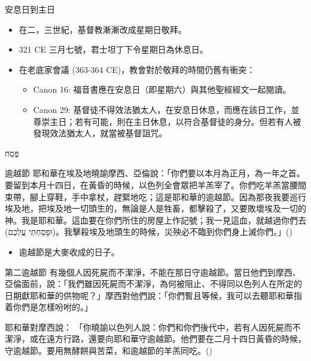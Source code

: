 \documentclass{beamer}
\newcommand{\topic}[1]{
  \begin{frame}
    \centering
    \vspace*{1cm}
    {\fontsize{40}{48}\selectfont #1\par}
    \vfill
  \end{frame}
}
\newcommand{\parvspace}{\par\vspace{0.5em}}
\begin{document}
\begin{frame}{安息日到主日}
  \begin{itemize}
    \item 在二，三世紀，基督教漸漸改成星期日敬拜。\parencite{SabbathInChristianity}
    \item 321 CE 三月七號，君士坦丁下令星期日為休息日。\parencite{SabbathInChristianity}
    \item 在老底家會議 (363-364 CE)，教會對於敬拜的時間仍舊有衝突\parencite{SynodOfLaodicea}：
      \begin{itemize}
        \item Canon 16: 福音書應在安息日（即星期六）與其他聖經經文一起閱讀。
        \item Canon 29: 基督徒不得效法猶太人，在安息日休息，而應在該日工作，並尊崇主日；若有可能，則在主日休息，以符合基督徒的身分。但若有人被發現效法猶太人，就當被基督詛咒。
      \end{itemize}
  \end{itemize}
\end{frame}

\topic{\texthebrew{פֶּסַח}}

\begin{frame}{逾越節}
  耶和華在埃及地曉諭摩西、亞倫說：「你們要以\alert{本月為正月}，為一年之首。\textellipsis{}要留到\alert{本月十四日}，在黃昏的時候，以色列全會眾把羊羔宰了。\textellipsis{}你們吃羊羔當腰間束帶，腳上穿鞋，手中拿杖，趕緊地吃；這是耶和華的逾越節。因為那夜我要巡行埃及地，把埃及地一切頭生的，無論是人是牲畜，都擊殺了，又要敗壞埃及一切的神。我是耶和華。這血要在你們所住的房屋上作記號；我一見這血，\alert{就越過你們去 (\texthebrew{וּפָסַחְתִּי עֲלֵכֶם})}。我擊殺埃及地頭生的時候，災殃必不臨到你們身上滅你們。」()\parvspace
  \begin{itemize}
    \item 逾越節是大麥收成的日子。
  \end{itemize}
\end{frame}

\begin{frame}{第二逾越節}
  有幾個人因死屍而不潔淨，不能在那日守逾越節。當日他們到摩西、亞倫面前，說：「我們雖因死屍而不潔淨，為何被阻止、不得同以色列人在所定的日期獻耶和華的供物呢？」摩西對他們說：「你們暫且等候，我可以去聽耶和華指着你們是怎樣吩咐的。」\parvspace
  耶和華對摩西說： 「你曉諭以色列人說：你們和你們後代中，若有人因死屍而不潔淨，或在遠方行路，還要向耶和華守逾越節。他們要在\alert{二月十四日黃昏的時候，守逾越節}。要用無酵餅與苦菜，和逾越節的羊羔同吃。()\parvspace
\end{frame}
\end{document}
